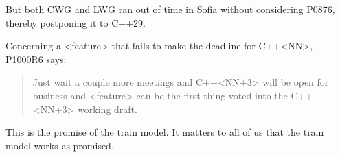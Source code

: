 But both CWG and LWG ran out of time in Sofia without considering P0876,
thereby postponing it to C++29.

Concerning a <feature> that fails to make the deadline for C++<NN>,
\href{https://www.open-std.org/jtc1/sc22/wg21/docs/papers/2024/p1000r6.pdf}{P1000R6}
says:
\begin{quote}
Just wait a couple more meetings and C++<NN+3> will be open for business and <feature> can be
the first thing voted into the C++<NN+3> working draft.
\end{quote}

This is the promise of the train model. It matters to all of us that the train
model works as promised.
